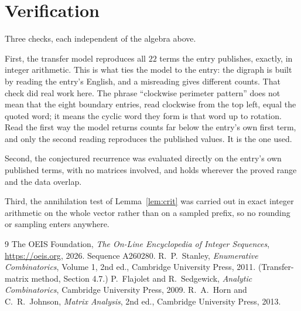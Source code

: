 \documentclass[11pt,a4paper]{article}
\theoremstyle{plain}
\theoremstyle{definition}
\begin{document}
\section{Verification}

Three checks, each independent of the algebra above.

First, the transfer model reproduces all $22$ terms the entry publishes, exactly, in
integer arithmetic. This is what ties the model to the entry: the digraph is built by reading
the entry's English, and a misreading gives different counts. That check did real work here. The phrase ``clockwise perimeter pattern'' does not mean that the eight boundary entries, read clockwise from the top left, equal the quoted word; it means the cyclic word they form is that word up to rotation. Read the first way the model returns counts far below the entry's own first term, and only the second reading reproduces the published values. It is the one used.

Second, the conjectured recurrence was evaluated directly on the entry's own published terms,
with no matrices involved, and holds wherever the proved range and the data overlap.

Third, the annihilation test of Lemma~\ref{lem:crit} was carried out in exact integer
arithmetic on the whole vector rather than on a sampled prefix, so no rounding or sampling
enters anywhere.

\begin{thebibliography}{9}
 The OEIS Foundation, \emph{The On-Line Encyclopedia of Integer
Sequences}, \url{https://oeis.org}, 2026. Sequence A260280.
 R.~P.~Stanley, \emph{Enumerative Combinatorics}, Volume 1, 2nd ed.,
Cambridge University Press, 2011. (Transfer-matrix method, Section 4.7.)
 P.~Flajolet and R.~Sedgewick, \emph{Analytic Combinatorics}, Cambridge
University Press, 2009.
 R.~A.~Horn and C.~R.~Johnson, \emph{Matrix Analysis}, 2nd ed., Cambridge
University Press, 2013.
\end{thebibliography}
\end{document}
